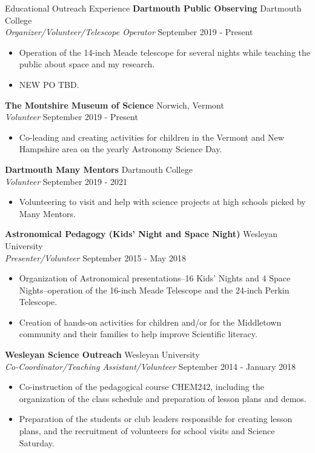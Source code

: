 \documentclass{resume} %
\begin{document}
\begin{rSection}{Educational Outreach Experience}
{\bf Dartmouth Public Observing} \hfill{Dartmouth College}\\
{\sl Organizer/Volunteer/Telescope Operator} \hfill September 2019 - Present
\begin{itemize} \itemsep -5pt
\item Operation of the 14-inch Meade telescope for several nights while teaching the public about space and my research.
\item NEW PO TBD.
\end{itemize}

{\bf The Montshire Museum of Science} \hfill{Norwich, Vermont}\\
{\sl Volunteer} \hfill September 2019 - Present
\begin{itemize} \itemsep -5pt
\item Co-leading and creating activities for children in the Vermont and New Hampshire area on the yearly Astronomy Science Day.
\end{itemize}

{\bf Dartmouth Many Mentors} \hfill{Dartmouth College}\\
{\sl Volunteer} \hfill September 2019 - 2021
\begin{itemize} \itemsep -5pt
\item Volunteering to visit and help with science projects at high schools picked by Many Mentors.
\end{itemize}

{\bf Astronomical Pedagogy (Kids' Night and Space Night)} \hfill{Wesleyan University}\\
{\sl Presenter/Volunteer} \hfill September 2015 - May 2018
\begin{itemize} \itemsep -5pt
\item Organization of Astronomical presentations--16 Kids' Nights and 4 Space Nights--operation of the 16-inch Meade Telescope and the 24-inch Perkin Telescope.
\item Creation of hands-on activities for children and/or for the Middletown community and their families to help improve Scientific literacy.
\end{itemize}

{\bf Wesleyan Science Outreach} \hfill{Wesleyan University} \\
{\sl Co-Coordinator/Teaching Assistant/Volunteer} \hfill September 2014 - January 2018
\begin{itemize} \itemsep -5pt
\item Co-instruction of the pedagogical course CHEM242, including the organization of the class schedule and preparation of lesson plans and demos.
\item Preparation of the students or club leaders responsible for creating lesson plans, and the recruitment of volunteers for school visits and Science Saturday.
\end{itemize}
\end{rSection}
\end{document}
